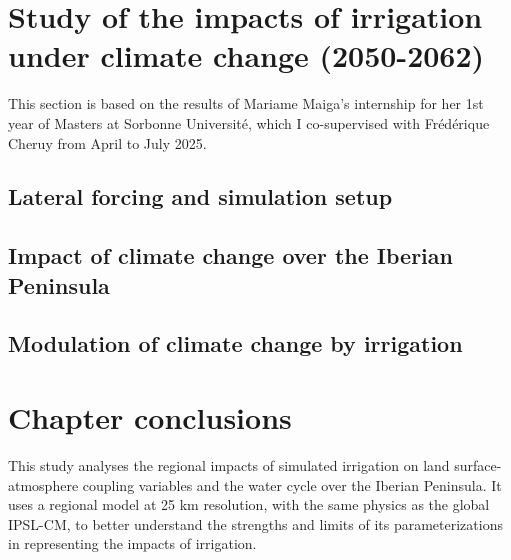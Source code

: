\clearpage

\section{Study of the impacts of irrigation under climate change (2050-2062)}
\label{sec:climate_change}
This section is based on the results of Mariame Maiga's internship for her 1st year of Masters at Sorbonne Université, which I co-supervised with Frédérique Cheruy from April to July 2025.
\subsection{Lateral forcing and simulation setup}
\subsection{Impact of climate change over the Iberian Peninsula}
\subsection{Modulation of climate change by irrigation}
\clearpage

\section{Chapter conclusions}


This study analyses the regional impacts of simulated irrigation on land surface-atmosphere coupling variables and the water cycle over the Iberian Peninsula. It uses a regional model at 25 km resolution, with the same physics as the global IPSL-CM, to better understand the strengths and limits of its parameterizations in representing the impacts of irrigation.

